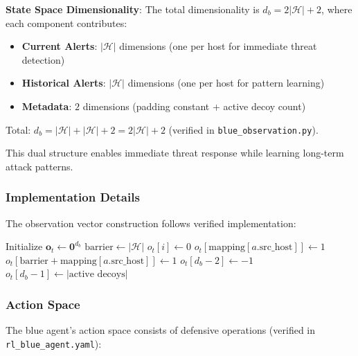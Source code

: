 \documentclass[12pt,twoside]{article}
\theoremstyle{definition}
\theoremstyle{plain}
\begin{document}
\textbf{State Space Dimensionality}: The total dimensionality is $d_b = 2|\mathcal{H}| + 2$, where each component contributes:

\begin{itemize}
\item \textbf{Current Alerts}: $|\mathcal{H}|$ dimensions (one per host for immediate threat detection)
\item \textbf{Historical Alerts}: $|\mathcal{H}|$ dimensions (one per host for pattern learning)
\item \textbf{Metadata}: $2$ dimensions (padding constant + active decoy count)
\end{itemize}

Total: $d_b = |\mathcal{H}| + |\mathcal{H}| + 2 = 2|\mathcal{H}| + 2$ (verified in \texttt{blue\_observation.py}).

This dual structure enables immediate threat response while learning long-term attack patterns.

\subsubsection{Implementation Details}
The observation vector construction follows verified implementation:

\begin{algorithm}
\caption{Blue Observation Vector Construction (Verified)}
\begin{algorithmic}[1]
\STATE Initialize $\mathbf{o}_t \leftarrow \mathbf{0}^{d_b}$
\STATE $\text{barrier} \leftarrow |\mathcal{H}|$
    \STATE $o_t[i] \leftarrow 0$ 
\ENDFOR
{}
        \STATE $o_t[\text{mapping}[a.\text{src\_host}]] \leftarrow 1$
        \STATE $o_t[\text{barrier} + \text{mapping}[a.\text{src\_host}]] \leftarrow 1$ 
    \ENDIF
\ENDFOR
\STATE $o_t[d_b-2] \leftarrow -1$ 
\STATE $o_t[d_b-1] \leftarrow |\text{active decoys}|$ 
\end{algorithmic}
\end{algorithm}

\subsubsection{Action Space}
The blue agent's action space consists of defensive operations (verified in \texttt{rl\_blue\_agent.yaml}):
\end{document}
